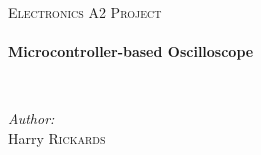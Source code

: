 \begin{titlepage}
  \begin{center}
    \null
    \vspace{0.5cm}

    \textsc{\Large Electronics A2 Project}\\[0.5cm]

    \HRule \\[0.4cm]
    { \huge \bfseries Microcontroller-based Oscilloscope \\[0.4cm] }

    \HRule \\[1.5cm]

    \begin{flushright} \large
    \emph{Author:} \\
      Harry \textsc{Rickards}
    \end{flushright}

    \vfill

    \Huge{\ccLogo\, \ccAttribution\, \ccNonCommercialEU} \\[1.5cm]

    \large \the\year
  \end{center}
\end{titlepage}
